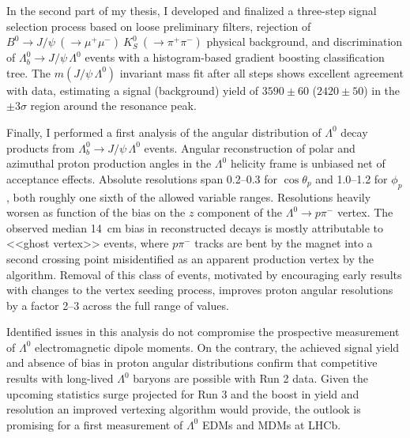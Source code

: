 \documentclass[12pt,a4paper]{book}
\newcommand{\demonstratorshort}{$\Lambda_b^0 \rightarrow J/\psi\,\Lambda^0$\xspace}
\newcommand{\physbkgfull}{$B^0 \rightarrow J/\psi~(\rightarrow \mu^+ \mu^-)~K^0_S~(\rightarrow \pi^+\pi^-)$\xspace}
\newcommand{\lz}{$\Lambda^0$\xspace}
\newcommand{\lambdadecay}{$\Lambda^0 \rightarrow p\pi^-$\xspace}
\newcommand{\cthetap}{$\cos\theta_p$\xspace}
\newcommand{\phip}{$\phi_p$\xspace}
\begin{document}
In the second part of my thesis, I developed and finalized a three-step signal selection process based on loose preliminary filters, rejection of \physbkgfull physical background, and discrimination of \demonstratorshort events with a histogram-based gradient boosting classification tree.
The $m(J/\psi\,\Lambda^0)$ invariant mass fit after all steps shows excellent agreement with data, estimating a signal (background) yield of $3590 \pm 60$ ($2420 \pm 50$) in the $\pm3\sigma$ region around the resonance peak.

Finally, I performed a first analysis of the angular distribution of \lz decay products from \demonstratorshort events.
Angular reconstruction of polar and azimuthal proton production angles in the \lz helicity frame is unbiased net of acceptance effects.
Absolute resolutions span 0.2--0.3 for \cthetap and 1.0--1.2 for \phip, both roughly one sixth of the allowed variable ranges.
Resolutions heavily worsen as function of the bias on the $z$ component of the \lambdadecay vertex.
The observed median \SI{14}{\centi\meter} bias in reconstructed decays is mostly attributable to <<ghost vertex>> events,
where $p\pi^-$ tracks are bent by the magnet into a second crossing point misidentified as an apparent production vertex by the algorithm.
Removal of this class of events, motivated by encouraging early results with changes to the vertex seeding process, improves proton angular resolutions by a factor 2--3 across the full range of values.

Identified issues in this analysis do not compromise the prospective measurement of \lz electromagnetic dipole moments.
On the contrary, the achieved signal yield and absence of bias in proton angular distributions confirm that competitive results with long-lived \lz baryons are possible with Run 2 data.
Given the upcoming statistics surge projected for Run 3 and the boost in yield and resolution an improved vertexing algorithm would provide, the outlook is promising for a first measurement of \lz EDMs and MDMs at LHCb.


\end{document}
